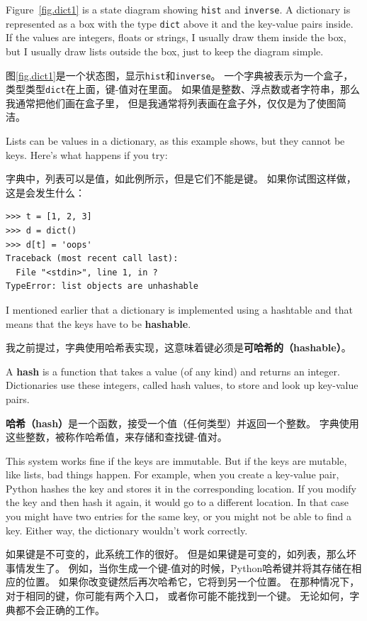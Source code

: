 \documentclass[10pt]{book}
\begin{document}
\begin{CJK}{UTF8}{gbsn}
Figure~\ref{fig.dict1} is a state diagram showing {\tt hist} and {\tt inverse}.
A dictionary is represented as a box with the type {\tt dict} above it
and the key-value pairs inside.  If the values are integers, floats or
strings, I usually draw them inside the box, but I usually draw lists
outside the box, just to keep the diagram simple.

图\ref{fig.dict1}是一个状态图，显示{\tt hist}和{\tt inverse}。
一个字典被表示为一个盒子，类型类型{\tt dict}在上面，键-值对在里面。
如果值是整数、浮点数或者字符串，那么我通常把他们画在盒子里，
但是我通常将列表画在盒子外，仅仅是为了使图简洁。

Lists can be values in a dictionary, as this example shows, but they
cannot be keys.  Here's what happens if you try:

字典中，列表可以是值，如此例所示，但是它们不能是键。
如果你试图这样做，这是会发生什么：

\begin{verbatim}
>>> t = [1, 2, 3]
>>> d = dict()
>>> d[t] = 'oops'
Traceback (most recent call last):
  File "<stdin>", line 1, in ?
TypeError: list objects are unhashable
\end{verbatim}
%
I mentioned earlier that a dictionary is implemented using
a hashtable and that means that the keys have to be {\bf hashable}.

我之前提过，字典使用哈希表实现，这意味着键必须是{\bf 可哈希的（hashable）}。

A {\bf hash} is a function that takes a value (of any kind)
and returns an integer.  Dictionaries use these integers,
called hash values, to store and look up key-value pairs.

{\bf 哈希（hash）}是一个函数，接受一个值（任何类型）并返回一个整数。
字典使用这些整数，被称作哈希值，来存储和查找键-值对。

This system works fine if the keys are immutable.  But if the
keys are mutable, like lists, bad things happen.  For example,
when you create a key-value pair, Python hashes the key and 
stores it in the corresponding location.  If you modify the
key and then hash it again, it would go to a different location.
In that case you might have two entries for the same key,
or you might not be able to find a key.  Either way, the
dictionary wouldn't work correctly.

如果键是不可变的，此系统工作的很好。
但是如果键是可变的，如列表，那么坏事情发生了。
例如，当你生成一个键-值对的时候，Python哈希键并将其存储在相应的位置。
如果你改变键然后再次哈希它，它将到另一个位置。
在那种情况下，对于相同的键，你可能有两个入口，
或者你可能不能找到一个键。
无论如何，字典都不会正确的工作。


\end{CJK}
\end{document}
